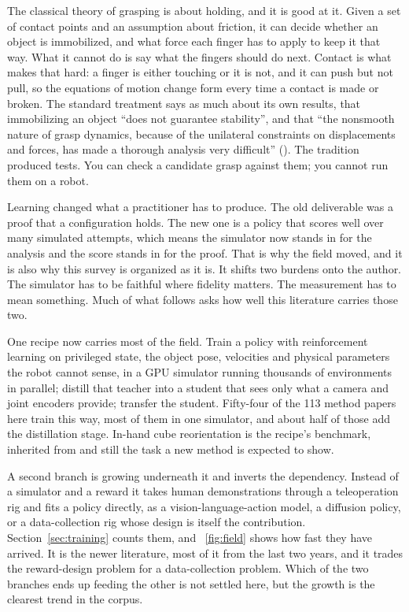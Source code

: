 The classical theory of grasping is about holding, and it is good at it. Given a set of contact
points and an assumption about friction, it can decide whether an object is immobilized, and
what force each finger has to apply to keep it that way. What it cannot do is say what the
fingers should do next. Contact is what makes that hard: a finger is either touching or it is
not, and it can push but not pull, so the equations of motion change form every time a contact
is made or broken. The standard treatment says as much about its own results, that immobilizing
an object ``does not guarantee stability'', and that ``the nonsmooth nature of grasp dynamics,
because of the unilateral constraints on displacements and forces, has made a thorough analysis
very difficult'' (\cite[Sec.~1.5 and 1.8]{bicchi_grasping_chapter_2001}). The tradition
produced tests. You can check a candidate grasp against them; you cannot run them on a robot.

Learning changed what a practitioner has to produce. The old deliverable was a proof that a
configuration holds. The new one is a policy that scores well over many simulated attempts,
which means the simulator now stands in for the analysis and the score stands in for the proof.
That is why the field moved, and it is also why this survey is organized as it is. It shifts
two burdens onto the author. The simulator has to be faithful where fidelity matters. The
measurement has to mean something. Much of what follows asks how well this literature carries
those two.

One recipe now carries most of the field. Train a policy with reinforcement learning on
privileged state, the object pose, velocities and physical parameters the robot cannot sense,
in a GPU simulator running thousands of environments in parallel; distill that teacher into a
student that sees only what a camera and joint encoders provide; transfer the student.
Fifty-four of the 113 method papers here train this way, most of them in one simulator, and
about half of those add the distillation stage. In-hand cube reorientation is the recipe's benchmark,
inherited from \cite{openai_dexterity_2018} and still the task a new method is expected to
show.

A second branch is growing underneath it and inverts the dependency. Instead of a simulator and
a reward it takes human demonstrations through a teleoperation rig and fits a policy directly,
as a vision-language-action model, a diffusion policy, or a data-collection rig whose design is
itself the contribution. Section~\ref{sec:training} counts them, and
\figurename~\ref{fig:field} shows how fast they have arrived. It is the newer literature, most
of it from the last two years, and it trades the reward-design problem for a data-collection
problem. Which of the two branches ends up feeding the other is not settled here, but the growth
is the clearest trend in the corpus.

